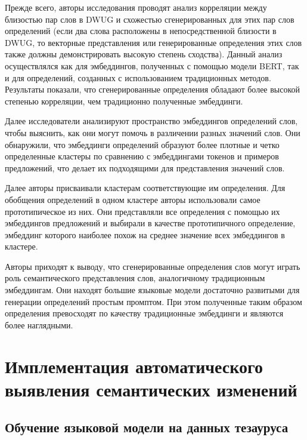 \documentclass[LI,VKR]{HSEUniversity}
\begin{document}
Прежде всего, авторы исследования проводят анализ корреляции между близостью пар слов в DWUG и
схожестью сгенерированных для этих пар слов определений (если два слова расположены в
непосредственной близости в DWUG, то векторные представления или генерированные определения
этих слов также должны демонстрировать высокую степень сходства).
Данный анализ осуществлялся как для эмбеддингов, полученных с помощью модели BERT,
так и для определений, созданных с использованием традиционных методов.
Результаты показали, что сгенерированные определения обладают более высокой степенью
корреляции, чем традиционно полученные эмбеддинги.

Далее исследователи анализируют пространство эмбеддингов определений слов,
чтобы выяснить, как они могут помочь в различении разных значений слов.
Они обнаружили, что эмбеддинги определений образуют более плотные и четко определенные
кластеры по сравнению с эмбеддингами токенов и примеров предложений, что делает их
подходящими для представления значений слов.

Далее авторы присваивали кластерам соответствующие им определения.
Для обобщения определений в одном кластере авторы использовали самое прототипическое из них.
Они представляли все определения с помощью их эмбеддингов предложений и выбирали в качестве
прототипичного определение, эмбеддинг которого наиболее похож на среднее значение всех
эмбеддингов в кластере.

Авторы приходят к выводу, что сгенерированные определения слов могут играть роль
семантического представления слов, аналогичному традиционным эмбеддингам.
Они находят большие языковые модели достаточно развитыми для генерации определений
простым промптом.
При этом полученные таким образом определения превосходят по качеству
традиционные эмбеддинги и являются более наглядными.

\chapter{Имплементация автоматического выявления семантических изменений}

\section{Обучение языковой модели на данных тезауруса}
\end{document}
